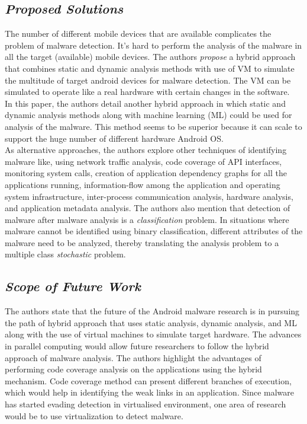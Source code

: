 \documentclass[letterpaper,10pt]{texMemo}
\begin{document}
\subsection*{\textit{Proposed Solutions}}\label{ref:paper_sol}
The number of different mobile devices that are available complicates the problem of malware detection. It's hard to perform the analysis of the malware in all the target (available) mobile devices. The authors \textit{propose} a hybrid approach that combines static and dynamic analysis methods with use of VM to simulate the multitude of target android devices for malware detection. The VM can be simulated to operate like a real hardware with certain changes in the software. \\
In this paper, the authors detail another hybrid approach in which static and dynamic analysis methods along with machine learning (ML) could be used for analysis of the malware. This method seems to be superior because it can scale to support the huge number of different hardware Android OS. \\ 
As alternative approaches, the authors explore other techniques of identifying malware like, using network traffic analysis, code coverage of API interfaces, monitoring system calls, creation of application dependency graphs for all the applications running, information-flow among the application and operating system infrastructure, inter-process communication analysis, hardware analysis, and application metadata analysis. The authors also mention that detection of malware after malware analysis is a \textit{classification} problem. In situations where malware cannot be identified using binary classification, different attributes of the malware need to be analyzed, thereby translating the analysis problem to a multiple class \textit{stochastic} problem. \\ 
\subsection*{\textit{Scope of Future Work}}\label{ref:paper_scope}
The authors state that the future of the Android malware research is in pursuing the path of hybrid approach that uses static analysis, dynamic analysis, and ML along with the use of virtual machines to simulate target hardware. The advances in parallel computing would allow future researchers to follow the hybrid approach of malware analysis. The authors highlight the advantages of performing code coverage analysis on the applications using the hybrid mechanism. Code coverage method can present different branches of execution, which would help in identifying the weak links in an application. Since malware has started evading detection in virtualised environment, one area of research would be to use virtualization to detect malware.
\end{document}
